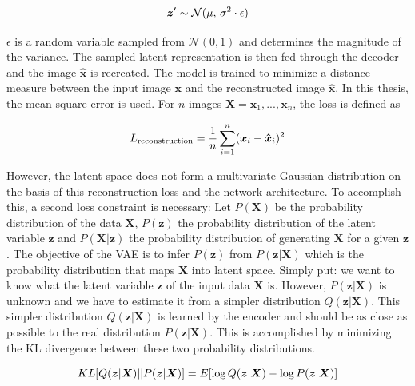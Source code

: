 \begin{equation}\eqlbl{hso_1}
	\boldsymbol{z}' \sim \mathcal{N}(\mu,\,\sigma^{2} \cdot \epsilon)
\end{equation}

$\epsilon$ is a random variable sampled from  $\mathcal{N}(0, 1)$ and determines the magnitude of the variance. The sampled latent representation is then fed through the decoder and the image $\hat{\boldsymbol{x}}$ is recreated. The model is trained to minimize a distance measure between the input image $\boldsymbol{x}$ and the reconstructed image $\hat{\boldsymbol{x}}$. In this thesis, the mean square error is used. For $n$ images $\boldsymbol{X} = \boldsymbol{x}_1, ..., \boldsymbol{x}_n$, the loss is defined as

\begin{equation}\eqlbl{hso_2}
	L_{\text{reconstruction}} = \frac{1}{n} \sum_{i=1}^{n} (\boldsymbol{x}_i - \boldsymbol{\hat{x}}_i)^2
\end{equation}

However, the latent space does not form a multivariate Gaussian distribution on the basis of this reconstruction loss and the network architecture. To accomplish this, a second loss constraint is necessary: Let $P(\boldsymbol{X})$ be the probability distribution of the data $\boldsymbol{X}$, $P(\boldsymbol{z})$ the probability distribution of the latent variable $\boldsymbol{z}$ and $P(\boldsymbol{X}|\boldsymbol{z})$ the probability distribution of generating $\boldsymbol{X}$ for a given $\boldsymbol{z}$. The objective of the VAE is to infer $P(\boldsymbol{z})$ from $P(\boldsymbol{z}|\boldsymbol{X})$ which is the probability distribution that maps $\boldsymbol{X}$ into latent space. Simply put: we want to know what the latent variable $\boldsymbol{z}$ of the input data $\boldsymbol{X}$ is.
However, $P(\boldsymbol{z}|\boldsymbol{X})$ is unknown and we have to estimate it from a simpler distribution $Q(\boldsymbol{z}|\boldsymbol{X})$. This simpler distribution $Q(\boldsymbol{z}|\boldsymbol{X})$ is learned by the encoder and should be as close as possible to the real distribution $P(\boldsymbol{z}|\boldsymbol{X})$. This is accomplished by minimizing the KL divergence between these two probability distributions.

\begin{equation}\eqlbl{hso_3}
	KL[Q(\boldsymbol{z}|\boldsymbol{X}) || P(\boldsymbol{z}|\boldsymbol{X})] = E[\log Q(\boldsymbol{z}|\boldsymbol{X}) - \log P(\boldsymbol{z}|\boldsymbol{X})]
\end{equation}


